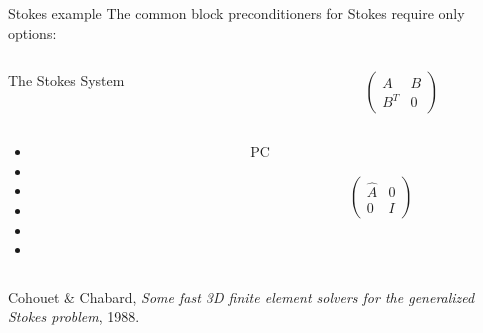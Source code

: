 \begin{frame}[fragile]{Stokes example}
The common block preconditioners for Stokes require only options:
\begin{overprint}
\begin{columns}
\begin{column}[t]{0.67\textwidth}
\begin{center}\Huge The Stokes System\end{center}
\end{column}
\begin{column}[t]{0.33\textwidth}
\Huge
\begin{equation*}
\begin{pmatrix}
A & B \\
B^T & 0
\end{pmatrix}
\end{equation*}
\end{column}
\end{columns}
%
\begin{columns}
\begin{column}[t]{0.67\textwidth}
\begin{itemize}
  \item[] 
  \item[] 
  \medskip
  \item[] 
  \item[] 
  \medskip
  \item[] 
  \item[] 
\end{itemize}
\end{column}
\begin{column}[t]{0.33\textwidth}
\Huge\begin{center}PC\end{center}
\begin{equation*}
\begin{pmatrix}
\hat A & 0 \\
    0  & I
\end{pmatrix}
\end{equation*}
\end{column}
\end{columns}
\medskip
\scriptsize
  Cohouet \& Chabard, \emph{Some fast 3D finite element solvers for the generalized Stokes problem}, 1988.
%
\begin{columns}

\end{columns}
\end{overprint}
\end{frame}
